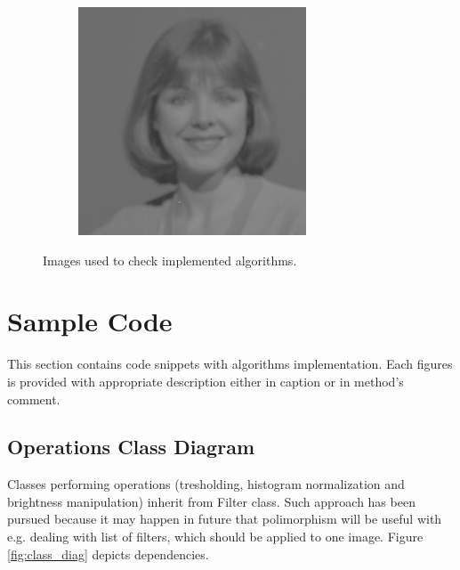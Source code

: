 \documentclass{article}
\begin{document}
\begin{figure}[H]
\begin{subfigure}{.5\textwidth}
  \caption{}
  \label{fig:sample_3}
\end{subfigure}%
\begin{subfigure}{.5\textwidth}
  \centering
  \includegraphics[width=0.97\linewidth]{_Figures/sample_4.png}
    \caption{}
  \label{fig:sample_4}
\end{subfigure}
\caption{Images used to check implemented algorithms.}
\label{fig:double_samples}
\end{figure}




\newpage
\section{Sample Code}
This section contains code snippets with algorithms implementation. Each figures is provided with appropriate description either in caption or in method's comment. 

%
%
\subsection{Operations Class Diagram}
Classes performing operations (tresholding, histogram normalization and brightness manipulation) inherit from Filter class. Such approach has been pursued because it may happen in future that polimorphism will be useful with e.g. dealing with list of filters, which should be applied to one image. Figure \ref{fig:class_diag} depicts dependencies.
\end{document}
